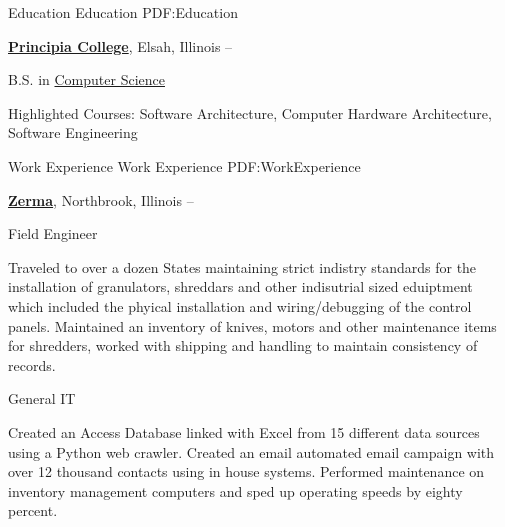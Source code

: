 \documentclass[a4paper,MMMyyyy,nonstopmode]{simpleresumecv}
\newcommand{\CVAuthor}{Bjørn Mathisen}
\newcommand{\CVWebpage}{https://bjornmathisen.com/}
\begin{document}

\Title{\CVAuthor}

\begin{SubTitle}
\href{https://goo.gl/maps/PwzyUhnuM922} %
{265 Melody Lane, Carpentersville, Illinois 60110, USA}
\par
\href{mailto:contact@bjornmathisen.com}
{contact@bjornmathisen.com}
\,\SubBulletSymbol\,
+1\,(224)\,622-8543
\,\SubBulletSymbol\,
\href{\CVWebpage}
{\url{Bjørn Mathisen}
\end{SubTitle}

\begin{Body}


\Section
{Education}
{Education}
{PDF:Education}

\Entry
\href{http://www.principiacollege.edu/}
{\textbf{Principia College}},
Elsah, Illinois
\hfill
{} --

\Gap
\BulletItem
B.S. in
\href{http://www.principiacollege.edu/computer-science}
{Computer Science}
\begin{Detail}
\SubBulletItem
Highlighted Courses: Software Architecture, Computer Hardware Architecture, Software Engineering 
\end{Detail}


\Section
{Work\newline
Experience}
{Work Experience}
{PDF:WorkExperience}

\Entry
\href{https://zerma.com/en}
{\textbf{Zerma}},
Northbrook, Illinois
\hfill {} --

\Gap
\BulletItem
Field Engineer

\begin{Detail}
\SubBulletItem
Traveled to over a dozen States maintaining strict indistry standards for the installation of granulators, shreddars and other indisutrial sized eduiptment which included the phyical installation and wiring/debugging of the control panels. 
\SubBulletItem
Maintained an inventory of knives, motors and other maintenance items for shredders, worked with shipping and handling to maintain consistency of records. 
\end{Detail}
\BulletItem
General IT
\begin{Detail}
\SubBulletItem
Created an Access Database linked with Excel from 15 different data sources using a Python web crawler. 
Created an email automated email campaign with over 12 thousand contacts using in house systems.
\SubBulletItem
Performed maintenance on inventory management computers and sped up operating speeds by eighty percent.
\end{Detail}


\end{Body}
\end{document}
